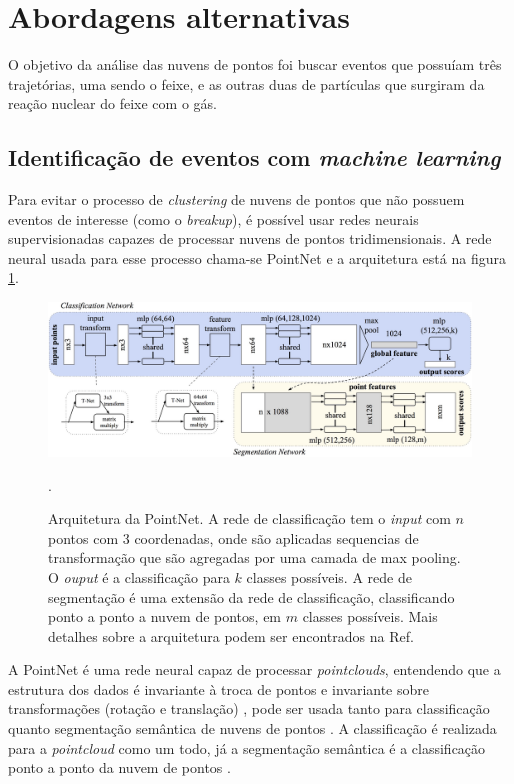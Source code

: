 \documentclass[a4paper,12pt,oneside]{book}
\begin{document}
\section{Abordagens alternativas}\label{sec:abordagens_alternativas}

\par  O objetivo da análise das nuvens de pontos foi buscar eventos que possuíam três trajetórias, uma sendo o feixe, e as outras duas de partículas que surgiram da reação nuclear do feixe com o gás.

\subsection{Identificação de eventos com \textit{machine learning}}\label{subsec:pointnet}

\par Para evitar o processo de \textit{clustering} de nuvens de pontos que não possuem eventos de interesse (como o \textit{breakup}), é possível usar redes neurais supervisionadas capazes de processar nuvens de pontos tridimensionais. A rede neural usada para esse processo chama-se PointNet \cite{qi2016pointnet} e a arquitetura está na figura \ref{fig:aqr:pointnet}.

\begin{figure}[H]
    \centering
    \includegraphics[scale = 0.22]{figs/pointnet_arch.png}
    \caption{Arquitetura da PointNet. A rede de classificação tem o \textit{input} com $n$ pontos com 3 coordenadas, onde são aplicadas sequencias de transformação que são agregadas por uma camada de max pooling. O \textit{ouput} é a classificação para $k$ classes possíveis. A rede de segmentação é uma extensão da rede de classificação, classificando ponto a ponto a nuvem de pontos, em $m$ classes possíveis. Mais detalhes sobre a arquitetura podem ser encontrados na Ref. \cite{qi2016pointnet}}.
    \label{fig:aqr:pointnet}
\end{figure}

\par A PointNet é uma rede neural capaz de processar \textit{pointclouds}, entendendo que a estrutura dos dados é invariante à troca de pontos e invariante sobre transformações (rotação e translação) \cite{RF_pc}, pode ser usada tanto para classificação quanto segmentação semântica de nuvens de pontos \cite{qi2016pointnet}. A classificação é realizada para a \textit{pointcloud} como um todo, já a segmentação semântica é a classificação ponto a ponto da nuvem de pontos \cite{qi2016pointnet}.
\end{document}
